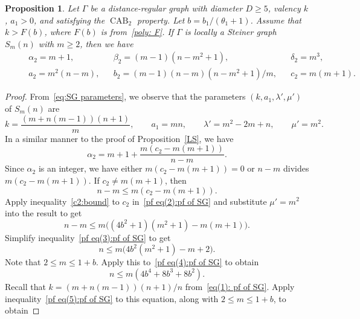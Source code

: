 \documentclass[11pt]{article}
\newtheorem{prop}[theo]{Proposition}
\theoremstyle{definition}
\numberwithin{equation}{section}
\numberwithin{equation}{section}
\begin{document}
\begin{prop}\label{Steiner}
Let $\Gamma$ be a distance-regular graph with diameter $D \geqslant 5$, valency $k$, $a_1 > 0$, and satisfying the $\operatorname{CAB}_2$ property. 
Let $b=b_1/(\theta_1+1)$.
Assume that $k > F(b)$, where $F(b)$ is from~\eqref{poly: F}.
If $\Gamma$ is locally a Steiner graph $S_m(n)$ with $m \geqslant 2$, then we have
\begin{align}
	&& & \alpha_2 =m+1, && \beta_2 =(m-1)(n-m^2+1), && \delta_2 = m^3, &&  \label{lem:SG para(1)}\\
	&& & a_2 = m^2(n-m), && b_2 = (m-1)(n-m)(n-m^2+1)/m, && c_2 = m(m+1). && \label{lem:SG para(2)}
\end{align}
\end{prop}
\begin{proof}
From~\eqref{eq:SG parameters}, we observe that the parameters $(k,a_1,\lambda', \mu')$ of $S_m(n)$ are 
\begin{equation}\label{eq(1): pf of SG}
	k= \frac{(m+n(m-1))(n+1)}{m}, \qquad a_1 =mn, \qquad \lambda' =  m^2-2m+n, \qquad \mu' = m^2.
\end{equation} 
In a similar manner to the proof of Proposition~\ref{LS}, we have
\begin{equation}\label{pf eq:alpha_2}
	\alpha_2 = m+1 + \frac{m(c_2 -m(m+1))}{n-m}.
\end{equation}
Since $\alpha_2$ is an integer, we have either $m(c_2 -m(m+1))=0$ or $n-m$ divides $m(c_2 -m(m+1))$.
If $c_2 \neq m(m+1)$, then 
\begin{equation}\label{pf eq(2):pf of SG}
	n-m \leqslant m(c_2 -m(m+1)).
\end{equation}
Apply inequality~\eqref{c2:bound} to $c_2$ in~\eqref{pf eq(2):pf of SG} and substitute $\mu' = m^2$ into the result to get
\begin{equation}\label{pf eq(3):pf of SG}
	n - m \leqslant m\big( (4b^2+1)(m^2+1) - m(m+1) \big).
\end{equation}
Simplify inequality~\eqref{pf eq(3):pf of SG} to get
\begin{equation}\label{pf eq(4):pf of SG}
	n \leqslant m \big( 4b^2(m^2+1) - m +2 \big).
\end{equation}
Note that $2\leqslant m \leqslant 1+b$.
Apply this to~\eqref{pf eq(4):pf of SG} to obtain
\begin{equation}\label{pf eq(5):pf of SG}
	n \leqslant m (4b^4 + 8b^3 + 8b^2).
\end{equation}
Recall that $k = (m+n(m-1))(n+1)/n$ from~\eqref{eq(1): pf of SG}.
Apply inequality~\eqref{pf eq(5):pf of SG} to this equation, along with $2\leqslant m \leqslant 1+b$, to obtain

\end{proof}
\end{document}

